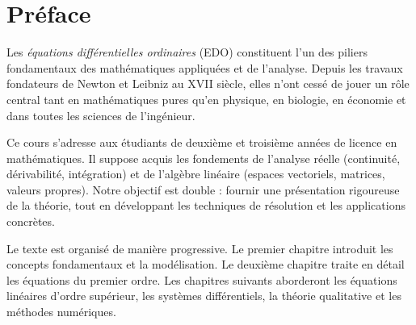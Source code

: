 \documentclass[12pt,a4paper,openany]{book}
\theoremstyle{definition}
\theoremstyle{plain}
\theoremstyle{remark}
\begin{document}
\begin{titlepage}
\end{titlepage}

\chapter*{Préface}

Les \emph{équations différentielles ordinaires} (EDO) constituent l'un des piliers fondamentaux des mathématiques appliquées et de l'analyse. Depuis les travaux fondateurs de Newton et Leibniz au XVII siècle, elles n'ont cessé de jouer un rôle central tant en mathématiques pures qu'en physique, en biologie, en économie et dans toutes les sciences de l'ingénieur.

Ce cours s'adresse aux étudiants de deuxième et troisième années de licence en mathématiques. Il suppose acquis les fondements de l'analyse réelle (continuité, dérivabilité, intégration) et de l'algèbre linéaire (espaces vectoriels, matrices, valeurs propres). Notre objectif est double : fournir une présentation rigoureuse de la théorie, tout en développant les techniques de résolution et les applications concrètes.

Le texte est organisé de manière progressive. Le premier chapitre introduit les concepts fondamentaux et la modélisation. Le deuxième chapitre traite en détail les équations du premier ordre. Les chapitres suivants aborderont les équations linéaires d'ordre supérieur, les systèmes différentiels, la théorie qualitative et les méthodes numériques.
\end{document}
